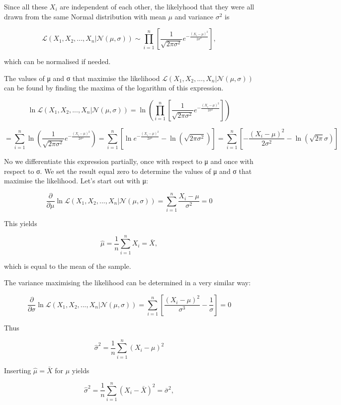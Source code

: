 \documentclass[11pt]{article}
\begin{document}
Since all these \(X_i\) are independent of each other, the likelyhood
that they were all drawn from the same Normal distribution with mean
\(μ\) and variance \(σ^2\) is

\[ \mathcal{L} \left( X_1, X_2, ..., X_n  | \mathcal{N}(μ, σ) \right) \sim \prod_{i=1}^{n} \left[ \frac{1}{\sqrt{2 \pi σ^2}} e^{-\frac{(X_i-μ)^2}{2σ^2}} \right], \]

which can be normalised if needed.

The values of μ and σ that maximise the likelihood
\(\mathcal{L} \left( X_1, X_2, ..., X_n | \mathcal{N}(μ, σ) \right)\)
can be found by finding the maxima of the logarithm of this expression.

\[ \ln \mathcal{L}\left( X_1, X_2, ..., X_n  | \mathcal{N}(μ, σ) \right) = \ln \left( \prod_{i=1}^{n} \left[ \frac{1}{\sqrt{2 \pi σ^2}} e^{-\frac{(X_i-μ)^2}{2σ^2}} \right] \right) \]

\[
= \sum_{i=1}^{n} \ln \left( \frac{1}{\sqrt{2 \pi σ^2}} e^{-\frac{(X_i-μ)^2}{2σ^2}}  \right) 
=\sum_{i=1}^{n} \left[ \ln  e^{-\frac{(X_i-μ)^2}{2σ^2}} -\ln \left( \sqrt{2 \pi σ^2} \right) \right]
= \sum_{i=1}^{n} \left[   -\frac{(X_i-μ)^2}{2σ^2} -\ln(\sqrt{2 \pi}σ)  \right]
\]

No we differentiate this expression partially, once with respect to μ
and once with respect to σ. We set the result equal zero to determine
the values of μ and σ that maximise the likelihood. Let's start out with
μ:

\[
\frac{\partial}{\partial μ} \ln \mathcal{L}\left( X_1, X_2, ..., X_n  | \mathcal{N}(μ, σ) \right)= \sum_{i=1}^{n} \frac{X_i-μ}{σ^2}=0
\]

This yields

\[ \hat{μ}=\frac{1}{n} \sum_{i=1}^{n} X_i= \bar{X},\]

which is equal to the mean of the sample.

The variance maximising the likelihood can be determined in a very
similar way:

\[\frac{\partial}{\partial σ} \ln \mathcal{L}\left( X_1, X_2, ..., X_n  | \mathcal{N}(μ, σ) \right)=  \sum_{i=1}^{n} \left[\frac{(X_i-μ)^2}{σ^3}  -\frac{1}{σ} \right]=0\]

Thus

\[
\hat{σ}^2=\frac{1}{n} \sum_{i=1}^{n} (X_i-μ)^2
\]

Inserting \(\hat{μ}=\bar{X}\) for \(μ\) yields

\[
\hat{σ}^2=\frac{1}{n} \sum_{i=1}^{n} (X_i-\bar{X})^2=\bar{σ}^2,
\]
\end{document}
